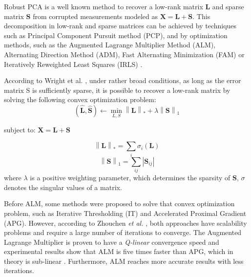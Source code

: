 Robust PCA is a well known method to recover a low-rank matrix $\textbf{L}$ and sparse matrix $\textbf{S}$ from corrupted measurements modeled as $\textbf{X} = \textbf{L} + \textbf{S}$. This decomposition in low-rank and sparse matrices can be achieved by techniques such as Principal Component Pursuit method (PCP), and by optimization methods, such as the Augmented Lagrange Multiplier Method (ALM), Alternating Direction Method (ADM), Fast Alternating Minimization (FAM) or Iteratively Reweighted Least Squares (IRLS) \cite{candes2011robust,vaswani2018robust,lerman2018overview}.

According to Wright et al. \cite{wright2009robust}, under rather broad conditions, as long as the error matrix S is sufficiently sparse, it is possible to recover a low-rank matrix by solving the following convex optimization problem:
\begin{equation}\label{eq:4.01}
	(\boldsymbol{\hat{L}}, \boldsymbol{\hat{S}})\leftarrow \min_{L,S}\left \| \boldsymbol{L} \right \|_{*} + \lambda \left \| \boldsymbol{S} \right \|_{1}
\end{equation}
\begin{center} subject to: $\boldsymbol{X} = \boldsymbol{L} + \boldsymbol{S}$ \end{center}
\begin{equation}\label{eq:4.02}
    \left \| \boldsymbol{L} \right \|_{*} = \sum_{i} \sigma_{i}(\boldsymbol{L})
\end{equation}
\begin{equation}\label{eq:4.03}
    \left \| \boldsymbol{S} \right \|_{1} = \sum_{ij} \left | \boldsymbol{S}_{ij} \right |
\end{equation}
where $\lambda$ is a positive weighting parameter, which determines the sparsity of $\boldsymbol{S}$, $\sigma$ denotes the singular values of a matrix. 

Before ALM, some methods were proposed to solve that convex optimization problem, such as Iterative Thresholding (IT) and Accelerated Proximal Gradient (APG). However, according to Zhouchen \emph{et al.} \cite{lin2010augmented}, both approaches have scalability problems and require a large number of iterations to converge. The Augmented Lagrange Multiplier is proven to have a \emph{Q-linear} convergence speed and experimental results show that ALM is five times faster than APG, which in theory is sub-linear \cite{lin2010augmented}. Furthermore, ALM reaches more accurate results with less iterations.

